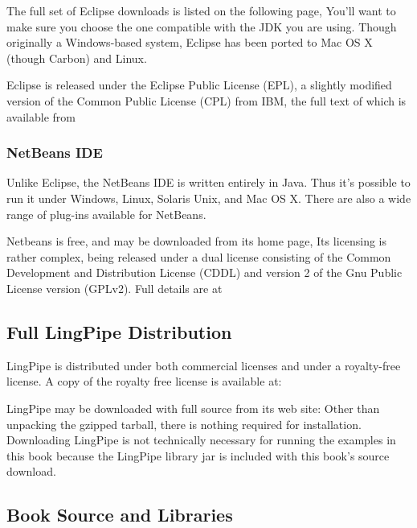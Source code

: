 The full set of Eclipse downloads is listed on the following page,
%
%
You'll want to make sure you choose the one compatible with the JDK
you are using.  Though originally a Windows-based system, Eclipse has been
ported to Mac OS X (though Carbon) and Linux.  

Eclipse is released under the Eclipse Public License (EPL), a slightly modified
version of the Common Public License (CPL) from IBM, the full text of which is
available from
%


\subsubsection{NetBeans IDE}

Unlike Eclipse, the NetBeans IDE is written entirely in Java.  Thus
it's possible to run it under Windows, Linux, Solaris Unix, and Mac OS
X. There are also a wide range of plug-ins available for NetBeans.

Netbeans is free, and may be downloaded from its home page,
%
%
Its licensing is rather complex, being released under a dual license
consisting of the Common Development and Distribution License (CDDL)
and version 2 of the Gnu Public License version (GPLv2).  Full details
are at
%


\subsection{Full LingPipe Distribution}

LingPipe is distributed under both commercial licenses
and under a royalty-free license.  A copy of the royalty free
license is available at:
%

LingPipe may be downloaded with full source from its web site:
%
%
Other than unpacking the gzipped tarball, there is nothing required
for installation.  Downloading LingPipe is not technically necessary for
running the examples in this book because the LingPipe library jar is
included with this book's source download.


\subsection{Book Source and Libraries}

